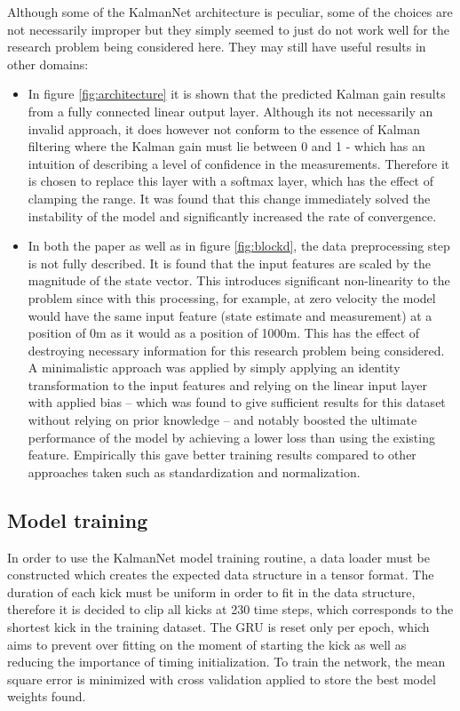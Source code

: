 \documentclass[a4paper,twoside,12pt]{report}
\begin{document}
Although some of the KalmanNet architecture is peculiar, some of the choices are not necessarily improper but they simply seemed to just do not work well for the research problem being considered here. They may still have useful results in other domains:
\begin{itemize}
    \item In figure \ref{fig:architecture} it is shown that the predicted Kalman gain results from a fully connected linear output layer. Although its not necessarily an invalid approach, it does however not conform to the essence of Kalman filtering where the Kalman gain must lie between 0 and 1 - which has an intuition of describing a level of confidence in the measurements. Therefore it is chosen to replace this layer with a softmax layer, which has the effect of clamping the range. It was found that this change immediately solved the instability of the model and significantly increased the rate of convergence.
    \item In both the \cite{kalmannet} paper as well as in figure \ref{fig:blockd}, the data preprocessing step is not fully described. It is found that the input features are scaled by the magnitude of the state vector. This introduces significant non-linearity to the problem since with this processing, for example, at zero velocity the model would have the same input feature (state estimate and measurement) at a position of 0m as it would as a position of 1000m. This has the effect of destroying necessary information for this research problem being considered. A minimalistic approach was applied by simply applying an identity transformation to the input features and relying on the linear input layer with applied bias -- which was found to give sufficient results for this dataset without relying on prior knowledge -- and notably boosted the ultimate performance of the model by achieving a lower loss than using the existing feature. Empirically this gave better training results compared to other approaches taken such as standardization and normalization.
\end{itemize}


\subsection{Model training}

In order to use the KalmanNet model training routine, a data loader must be constructed which creates the expected data structure in a tensor format. The duration of each kick must be uniform in order to fit in the data structure, therefore it is decided to clip all kicks at 230 time steps, which corresponds to the shortest kick in the training dataset. The GRU is reset only per epoch, which aims to prevent over fitting on the moment of starting the kick as well as reducing the importance of timing initialization. To train the network, the mean square error is minimized with cross validation applied to store the best model weights found.
\end{document}
